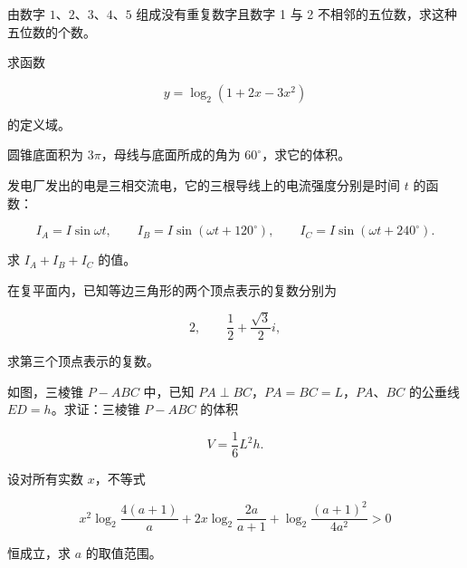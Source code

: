 \begin{question}
由数字 $1\text{、}2\text{、}3\text{、}4\text{、}5$ 组成没有重复数字且数字 1 与 2 不相邻的五位数，求这种五位数的个数。

\end{question}
\begin{question}
求函数

\nopagebreak[4]
\[
y=\log_2(1+2x-3x^2)
\]

的定义域。

\end{question}
\begin{question}
圆锥底面积为 $3\pi$，母线与底面所成的角为 $60^\circ$，求它的体积。

\end{question}
\begin{question}
发电厂发出的电是三相交流电，它的三根导线上的电流强度分别是时间 $t$ 的函数：

\nopagebreak[4]
\[
I_A=I\sin\omega t,\qquad
I_B=I\sin(\omega t+120^\circ),\qquad
I_C=I\sin(\omega t+240^\circ).
\]

求 $I_A+I_B+I_C$ 的值。

\end{question}
\begin{question}
在复平面内，已知等边三角形的两个顶点表示的复数分别为

\nopagebreak[4]
\[
2,\qquad \frac12+\frac{\sqrt3}{2}i,
\]

求第三个顶点表示的复数。

\Needspace{0.4\textheight}
\end{question}
\begin{question}
如图，三棱锥 $P-ABC$ 中，已知 $PA\perp BC$，$PA=BC=L$，$PA\text{、}BC$ 的公垂线 $ED=h$。求证：三棱锥 $P-ABC$ 的体积

\nopagebreak[4]
\[
V=\frac16L^2h.
\]
\nopagebreak[4]
\begin{center}\end{center}
\nopagebreak[4]
\end{question}
\begin{question}
设对所有实数 $x$，不等式

\nopagebreak[4]
\[
x^2\log_2\frac{4(a+1)}a
+2x\log_2\frac{2a}{a+1}
+\log_2\frac{(a+1)^2}{4a^2}>0
\]

恒成立，求 $a$ 的取值范围。

\end{question}
